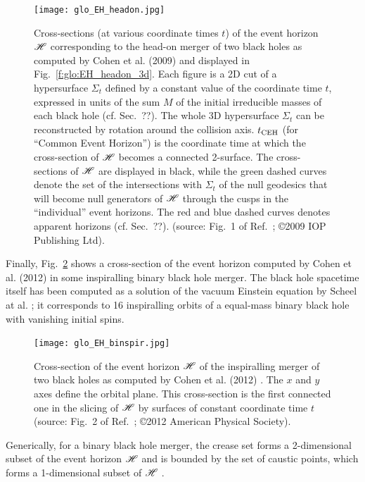 \begin{figure}
\centerline{\texttt{[image: glo\_EH\_headon.jpg]}}
\caption[]{\label{f:glo:EH_headon} \footnotesize
Cross-sections (at various coordinate times $t$) of the event horizon $\mathscr{H}$ corresponding
to the head-on merger of two black holes as computed by Cohen et al. (2009) \cite{CohenPS09}
and displayed in Fig.~\ref{f:glo:EH_headon_3d}.
Each figure is a 2D cut of a hypersurface $\Sigma_t$ defined by a constant
value of the coordinate time $t$, expressed in units of the sum $M$ of the initial irreducible masses of each black
hole (cf. Sec.~??). The whole 3D hypersurface $\Sigma_t$ can be reconstructed
by rotation around the collision axis.
$t_{\rm CEH}$ (for ``Common Event Horizon'')
is the coordinate time at which the cross-section of $\mathscr{H}$ becomes a connected
2-surface.
The cross-sections of $\mathscr{H}$ are displayed
in black, while the green dashed curves denote the set of the intersections
with $\Sigma_t$ of the null geodesics that
will become null generators of $\mathscr{H}$ through the cusps in the
``individual'' event horizons.
The red and blue dashed curves denotes apparent horizons (cf. Sec.~??).
(source: Fig.~1 of Ref.~\cite{CohenPS09}; \copyright  2009 IOP Publishing Ltd).}
\end{figure}

Finally, Fig.~\ref{f:glo:EH_binspir} shows a cross-section
of the event horizon computed by Cohen et al. (2012) \cite{CohenKS12}
in some inspiralling binary black hole merger. The
black hole spacetime itself has been computed as a solution of the vacuum
Einstein equation by Scheel at al. \cite{ScheeBCKMP09}; it corresponds to
16 inspiralling orbits of a equal-mass binary black hole with vanishing initial
spins.

\begin{figure}
\centerline{\texttt{[image: glo\_EH\_binspir.jpg]}}
\caption[]{\label{f:glo:EH_binspir} \footnotesize
Cross-section of the event horizon $\mathscr{H}$ of the inspiralling merger of
two black holes as computed by Cohen et al. (2012) \cite{CohenKS12}.
The $x$ and $y$ axes define the orbital plane.
This cross-section is the first connected one in the slicing of $\mathscr{H}$
by surfaces of constant coordinate time $t$
(source: Fig.~2 of Ref.~\cite{CohenKS12}; \copyright 2012 American Physical Society).}
\end{figure}

Generically, for a binary black hole merger,
the crease set forms a 2-dimensional subset of the event horizon
$\mathscr{H}$ and is bounded by the set of caustic points, which forms a 1-dimensional
subset of $\mathscr{H}$ \cite{Siino98a,Siino98b,HusaW99,CohenKS12}.

